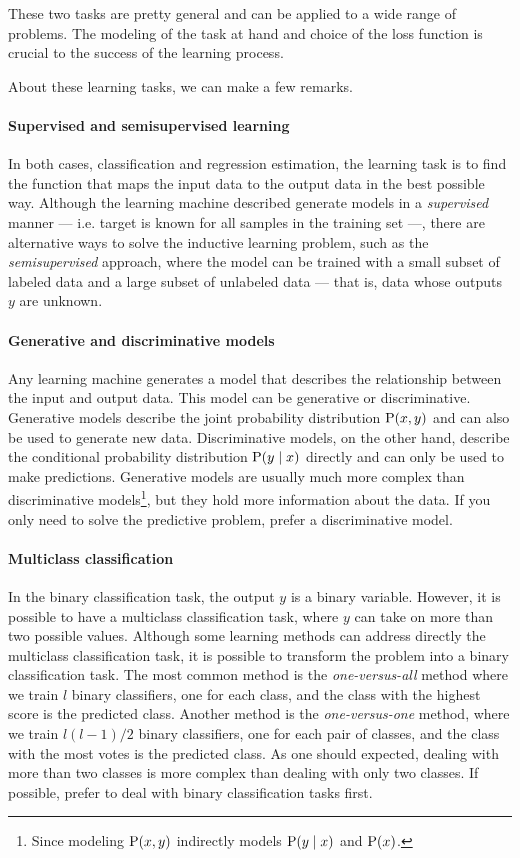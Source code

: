 These two tasks are pretty general and can be applied to a wide range of problems.  The
modeling of the task at hand and choice of the loss function is crucial to the success of
the learning process.

About these learning tasks, we can make a few remarks.

\paragraph{Supervised and semisupervised learning}
In both cases, classification and regression estimation, the learning task is to find the function
that maps the input data to the output data in the best possible way.  Although the
learning machine described generate models in a \emph{supervised} manner --- i.e. target
is known for all samples in the training set ---, there are
alternative ways to solve the inductive learning problem, such as the \emph{semisupervised}
approach, where the model can be trained with a small subset of labeled data and a large
subset of unlabeled data --- that is, data whose outputs $y$ are unknown.

\paragraph{Generative and discriminative models}
Any learning machine generates a model that describes the relationship between the input
and output data.  This model can be generative or discriminative.  Generative models
describe the joint probability distribution $\operatorname{P}(x, y)$ and can also be used to generate new
data.  Discriminative models, on the other hand, describe the conditional probability
distribution $\operatorname{P}(y \mid x)$ directly and can only be used to make predictions. Generative models are
usually much more complex than discriminative models\footnote{Since modeling $\operatorname{P}(x, y)$
indirectly models $\operatorname{P}(y \mid x)$ and $\operatorname{P}(x)$.}, but they hold more information about
the data.  If you only
need to solve the predictive problem, prefer a discriminative model.

\paragraph{Multiclass classification}
In the binary classification task, the output $y$ is
a binary variable.  However, it is possible to have a multiclass classification task,
where  $y$ can take on more than two possible values.  Although some learning methods can
address directly the multiclass classification task, it is possible to transform the
problem into a binary classification task.  The most common method is the
\emph{one-versus-all} method where we train $l$ binary classifiers, one for each class,
and the class with the highest score is the predicted class.  Another method is the
\emph{one-versus-one} method, where we train $l(l-1)/2$ binary classifiers, one for each
pair of classes, and the class with the most votes is the predicted class.
As one should expected, dealing with more than two classes is more complex than dealing
with only two classes.  If possible, prefer to deal with binary classification tasks first.

